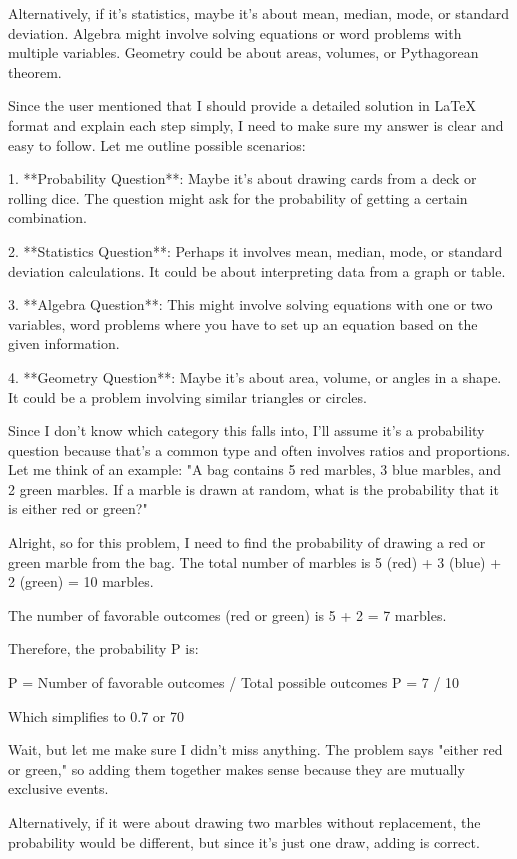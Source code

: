\documentclass[12pt]{article}
\begin{document}
Alternatively, if it's statistics, maybe it's about mean, median, mode, or standard deviation. Algebra might involve solving equations or word problems with multiple variables. Geometry could be about areas, volumes, or Pythagorean theorem. 

Since the user mentioned that I should provide a detailed solution in LaTeX format and explain each step simply, I need to make sure my answer is clear and easy to follow. Let me outline possible scenarios:

1. **Probability Question**: Maybe it's about drawing cards from a deck or rolling dice. The question might ask for the probability of getting a certain combination.

2. **Statistics Question**: Perhaps it involves mean, median, mode, or standard deviation calculations. It could be about interpreting data from a graph or table.

3. **Algebra Question**: This might involve solving equations with one or two variables, word problems where you have to set up an equation based on the given information.

4. **Geometry Question**: Maybe it's about area, volume, or angles in a shape. It could be a problem involving similar triangles or circles.

Since I don't know which category this falls into, I'll assume it's a probability question because that's a common type and often involves ratios and proportions. Let me think of an example: "A bag contains 5 red marbles, 3 blue marbles, and 2 green marbles. If a marble is drawn at random, what is the probability that it is either red or green?"

Alright, so for this problem, I need to find the probability of drawing a red or green marble from the bag. The total number of marbles is 5 (red) + 3 (blue) + 2 (green) = 10 marbles.

The number of favorable outcomes (red or green) is 5 + 2 = 7 marbles.

Therefore, the probability P is:

P = Number of favorable outcomes / Total possible outcomes
P = 7 / 10

Which simplifies to 0.7 or 70%

Wait, but let me make sure I didn't miss anything. The problem says "either red or green," so adding them together makes sense because they are mutually exclusive events.

Alternatively, if it were about drawing two marbles without replacement, the probability would be different, but since it's just one draw, adding is correct.
\end{document}
